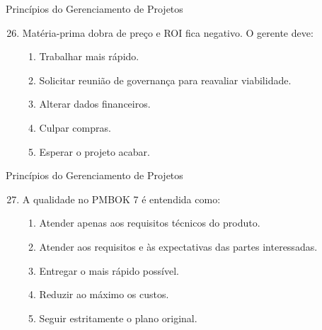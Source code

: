 \documentclass{beamer}
\begin{document}
\begin{frame}{Princípios do Gerenciamento de Projetos}
	\begin{enumerate}
		\setcounter{enumi}{25}
		\justifying
		\item Matéria-prima dobra de preço e ROI fica negativo. O gerente deve:
		\begin{enumerate}[a]
			\item Trabalhar mais rápido.
			\item \alert<2>{Solicitar reunião de governança para reavaliar viabilidade.}
			\item Alterar dados financeiros.
			\item Culpar compras.
			\item Esperar o projeto acabar.
		\end{enumerate}
	\end{enumerate}
\end{frame}

\begin{frame}{Princípios do Gerenciamento de Projetos}
	\begin{enumerate}
		\setcounter{enumi}{26}
		\justifying
		\item A qualidade no PMBOK 7 é entendida como:
		\begin{enumerate}[a]
			\item Atender apenas aos requisitos técnicos do produto.
			\item \alert<2>{Atender aos requisitos e às expectativas das partes interessadas.}
			\item Entregar o mais rápido possível.
			\item Reduzir ao máximo os custos.
			\item Seguir estritamente o plano original.
		\end{enumerate}
	\end{enumerate}
\end{frame}
\end{document}
